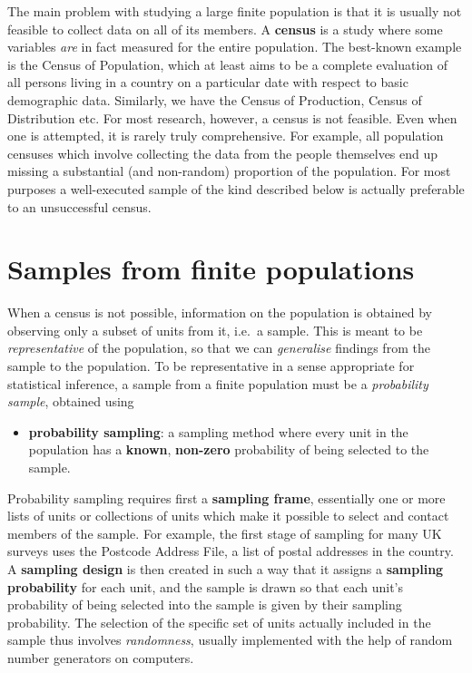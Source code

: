 \documentclass[11pt,a4paper,openany]{book}
\providecommand{\tightlist}{%
  \setlength{\itemsep}{0pt}\setlength{\parskip}{0pt}}
\begin{document}
The main problem with studying a large finite population is that it is
usually not feasible to collect data on all of its members. A
\textbf{census} is a study where some variables \emph{are} in fact
measured for the entire population. The best-known example is the Census
of Population, which at least aims to be a complete evaluation of all
persons living in a country on a particular date with respect to basic
demographic data. Similarly, we have the Census of Production, Census of
Distribution etc. For most research, however, a census is not feasible.
Even when one is attempted, it is rarely truly comprehensive. For
example, all population censuses which involve collecting the data from
the people themselves end up missing a substantial (and non-random)
proportion of the population. For most purposes a well-executed sample
of the kind described below is actually preferable to an unsuccessful
census.

\section{Samples from finite populations}\label{s-samples-samples}

When a census is not possible, information on the population is obtained
by observing only a subset of units from it, i.e.~a sample. This is
meant to be \emph{representative} of the population, so that we can
\emph{generalise} findings from the sample to the population. To be
representative in a sense appropriate for statistical inference, a
sample from a finite population must be a \emph{probability sample},
obtained using

\begin{itemize}
\tightlist
\item
  \textbf{probability sampling}: a sampling method where every unit in
  the population has a \textbf{known}, \textbf{non-zero} probability of
  being selected to the sample.
\end{itemize}

Probability sampling requires first a \textbf{sampling frame},
essentially one or more lists of units or collections of units which
make it possible to select and contact members of the sample. For
example, the first stage of sampling for many UK surveys uses the
Postcode Address File, a list of postal addresses in the country. A
\textbf{sampling design} is then created in such a way that it assigns a
\textbf{sampling probability} for each unit, and the sample is drawn so
that each unit's probability of being selected into the sample is given
by their sampling probability. The selection of the specific set of
units actually included in the sample thus involves \emph{randomness},
usually implemented with the help of random number generators on
computers.
\end{document}
